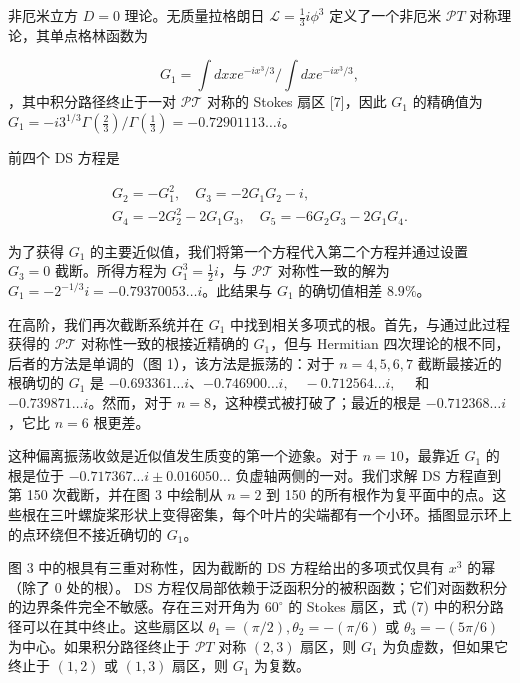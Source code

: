 \documentclass[UTF8]{ctexart}
\begin{document}
非厄米立方 \( D=0 \) 理论。无质量拉格朗日 \( \mathcal{L}=\frac{1}{3} i \phi^{3} \) 定义了一个非厄米 \( \mathcal{P} T \) 对称理论，其单点格林函数为


\[
G_{1}=\int d x x e^{-i x^{3} / 3} / \int d x e^{-i x^{3} / 3},
\]，其中积分路径终止于一对 \( \mathcal{P T} \) 对称的 Stokes 扇区 [7]，因此 \( G_{1} \) 的精确值为 \( G_{1}=-i 3^{1 / 3} \Gamma\left(\frac{2}{3}\right) / \Gamma\left(\frac{1}{3}\right)=-0.72901113 \ldots i \)。


前四个 DS 方程是




\[
\begin{array}{l}
G_{2}=-G_{1}^{2}, \quad G_{3}=-2 G_{1} G_{2}-i, \\
G_{4}=-2 G_{2}^{2}-2 G_{1} G_{3}, \quad G_{5}=-6 G_{2} G_{3}-2 G_{1} G_{4} .
\end{array}
\]


为了获得 \( G_{1} \) 的主要近似值，我们将第一个方程代入第二个方程并通过设置 \( G_{3}=0 \) 截断。所得方程为 \( G_{1}^{3}=\frac{1}{2} i \)，与 \( \mathcal{P T} \) 对称性一致的解为 \( G_{1}=-2^{-1 / 3} i=-0.79370053 \ldots i \)。此结果与 \( G_{1} \) 的确切值相差 \( 8.9 \% \)。

在高阶，我们再次截断系统并在 \( G_{1} \) 中找到相关多项式的根。首先，与通过此过程获得的 \( \mathcal{P T} \) 对称性一致的根接近精确的 \( G_{1} \)，但与 Hermitian 四次理论的根不同，后者的方法是单调的（图 1），该方法是振荡的：对于 \( n=4,5,6,7 \) 截断最接近的根确切的 \( G_{1} \) 是 \( -0.693361 \ldots i \)、\( -0.746900 \ldots i, \quad-0.712564 \ldots i, \quad \) 和 \( -0.739871 \ldots i \)。然而，对于 \( n=8 \)，这种模式被打破了；最近的根是 \( -0.712368 \ldots i \)，它比 \( n=6 \) 根更差。

这种偏离振荡收敛是近似值发生质变的第一个迹象。对于 \( n=10 \)，最靠近 \( G_{1} \) 的根是位于 \( -0.717367 \ldots i \pm 0.016050 \ldots \) 负虚轴两侧的一对。我们求解 DS 方程直到第 150 次截断，并在图 3 中绘制从 \( n=2 \) 到 150 的所有根作为复平面中的点。这些根在三叶螺旋桨形状上变得密集，每个叶片的尖端都有一个小环。插图显示环上的点环绕但不接近确切的 \( G_{1} \)。

图 3 中的根具有三重对称性，因为截断的 DS 方程给出的多项式仅具有 \( x^{3} \) 的幂（除了 0 处的根）。 DS 方程仅局部依赖于泛函积分的被积函数；它们对函数积分的边界条件完全不敏感。存在三对开角为 \( 60^{\circ} \) 的 Stokes 扇区，式 (7) 中的积分路径可以在其中终止。这些扇区以 \( \theta_{1}=(\pi / 2), \theta_{2}=-(\pi / 6) \) 或 \( \theta_{3}=-(5 \pi / 6) \) 为中心。如果积分路径终止于 \( \mathcal{P} T \) 对称 \( (2,3) \) 扇区，则 \( G_{1} \) 为负虚数，但如果它终止于 \( (1,2) \) 或 \( (1,3) \) 扇区，则 \( G_{1} \) 为复数。
\end{document}
